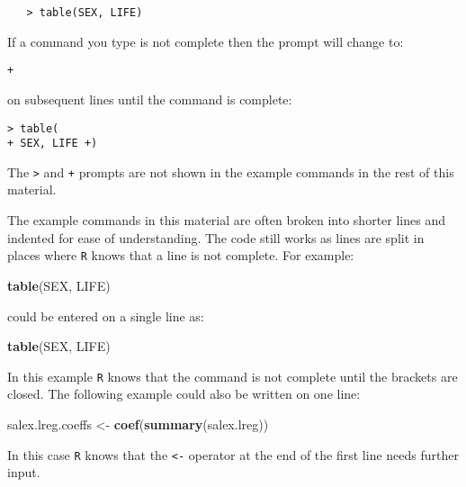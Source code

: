 \documentclass[]{book}
\newenvironment{Shaded}{\begin{snugshade}}{\end{snugshade}}
\newcommand{\KeywordTok}[1]{\textcolor[rgb]{0.13,0.29,0.53}{\textbf{#1}}}
\newcommand{\StringTok}[1]{\textcolor[rgb]{0.31,0.60,0.02}{#1}}
\newcommand{\NormalTok}[1]{#1}
\theoremstyle{definition}
\theoremstyle{definition}
\theoremstyle{definition}
\theoremstyle{remark}
\begin{document}
\begin{verbatim}
   > table(SEX, LIFE)
\end{verbatim}

If a command you type is not complete then the prompt will change to:

\begin{verbatim}
+
\end{verbatim}

on subsequent lines until the command is complete:

\begin{verbatim}
> table(
+ SEX, LIFE +)
\end{verbatim}

The \texttt{\textgreater{}} and \texttt{+} prompts are not shown in the
example commands in the rest of this material.

The example commands in this material are often broken into shorter
lines and indented for ease of understanding. The code still works as
lines are split in places where \texttt{R} knows that a line is not
complete. For example:

\begin{Shaded}
\begin{Highlighting}[]
\KeywordTok{table}\NormalTok{(SEX,}
\NormalTok{      LIFE)}
\end{Highlighting}
\end{Shaded}

could be entered on a single line as:

\begin{Shaded}
\begin{Highlighting}[]
\KeywordTok{table}\NormalTok{(SEX, LIFE)}
\end{Highlighting}
\end{Shaded}

In this example \texttt{R} knows that the command is not complete until
the brackets are closed. The following example could also be written on
one line:

\begin{Shaded}
\begin{Highlighting}[]
\NormalTok{salex.lreg.coeffs <-}
\StringTok{  }\KeywordTok{coef}\NormalTok{(}\KeywordTok{summary}\NormalTok{(salex.lreg))}
\end{Highlighting}
\end{Shaded}

In this case \texttt{R} knows that the \texttt{\textless{}-} operator at
the end of the first line needs further input.
\end{document}
